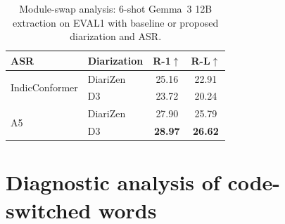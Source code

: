 \documentclass{article}
\begin{document}
\begin{table}[H]
  \centering
  \caption{Module-swap analysis: 6-shot Gemma~3 12B extraction on EVAL1 with baseline or proposed diarization and ASR.}
  \label{tab:synergy}
  \vspace{1mm}
  \begin{tabular}{l l c c}
    \toprule
    \textbf{ASR} & \textbf{Diarization} & \textbf{R-1}$\uparrow$ & \textbf{R-L}$\uparrow$ \\
    \midrule
    \multirow{2}{*}{IndicConformer} & DiariZen & 25.16 & 22.91 \\
                                    & D3             & 23.72 & 20.24 \\
    \midrule
    \multirow{2}{*}{A5}             & DiariZen & 27.90 & 25.79 \\
                                    & D3             & \textbf{28.97} & \textbf{26.62} \\
    \bottomrule
  \end{tabular}
\end{table}



\section{Diagnostic analysis of code-switched words}
\label{sec:cs}
\end{document}
